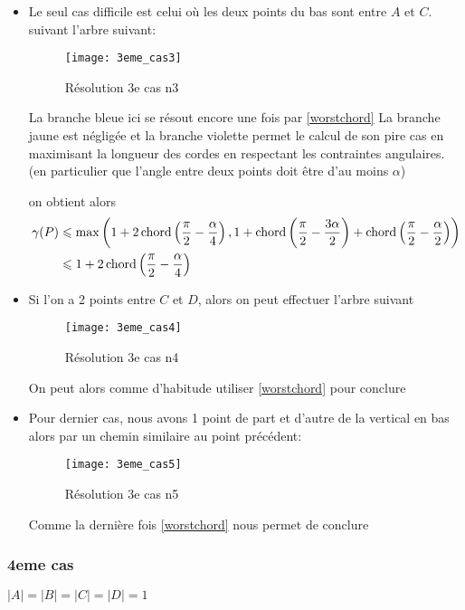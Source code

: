 \begin{itemize}
\begin{itemize}
\item \label{3cas21} Le seul cas difficile est celui où les deux points du bas sont entre $A$ et $C$.
suivant l'arbre suivant:

\begin{figure}[h!]
  \centering
  \texttt{[image: 3eme\_cas3]}
  \caption{Résolution 3e cas n3}
  \label{fig:3eme_cas3}
\end{figure}

La branche bleue ici se résout encore une fois par \ref{worstchord}
La branche jaune est négligée
et la branche violette permet le calcul de son pire cas en maximisant la longueur des cordes en respectant les contraintes angulaires. (en particulier que l'angle entre deux points doit être d'au moins $\alpha$)

on obtient alors
\begin{align*}
\gamma(P) &\leqslant \max\left(1+2\operatorname{chord}\left(\frac{\pi}{2} - \frac{\alpha}{4}\right), 1 + \operatorname{chord}\left(\frac{\pi}{2} - \frac{3\alpha}{2}\right) + \operatorname{chord}\left(\frac{\pi}{2} - \frac{\alpha}{2}\right)\right) \\
&\leqslant 1+2\operatorname{chord}\left(\frac{\pi}{2} - \frac{\alpha}{4}\right)
\end{align*}

\item \label{3cas22} Si l'on a 2 points entre $C$ et $D$, alors on peut effectuer l'arbre suivant

\begin{figure}[h!]
  \centering
  \texttt{[image: 3eme\_cas4]}
  \caption{Résolution 3e cas n4}
  \label{fig:3eme_cas4}
\end{figure}

On peut alors comme d'habitude utiliser \ref{worstchord} pour conclure

\item \label{3cas23} Pour dernier cas, nous avons 1 point de part et d'autre de la vertical en bas alors par un chemin similaire au point précédent:

\begin{figure}[h!]
  \centering
  \texttt{[image: 3eme\_cas5]}
  \caption{Résolution 3e cas n5}
  \label{fig:3eme_cas5}
\end{figure}

Comme la dernière fois \ref{worstchord} nous permet de conclure

\end{itemize}
\end{itemize}

\subsubsection*{4eme cas}\label{4cas} $|A| = |B| = |C| = |D| = 1$


